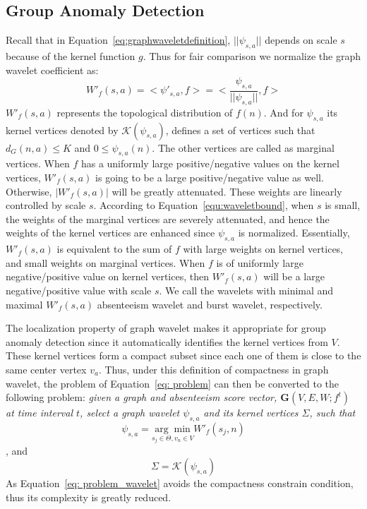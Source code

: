 \subsection{Group Anomaly Detection}
\label{sec:abnormalgroupdetection}
Recall that in Equation~\ref{eq:graphwaveletdefinition}, $||\psi_{s,a}||$ depends on scale $s$ because of the kernel function $g$. Thus for fair comparison we normalize the graph wavelet coefficient as:
\begin{equation}
\label{eq:graphwavelet}
W'_f(s,a)=<{\psi'_{s,a}}, f>=<\frac{\psi_{s,a}}{||\psi_{s,a}||}, f>
\end{equation}$W'_f(s,a)$ represents the topological distribution of $f(n)$. And for $\psi_{s,a}$ its kernel vertices denoted by $\mathcal{K}(\psi_{s,a})$, defines a set of vertices such that $d_G(n,a)\leq K$ and $0\leq\psi_{s,a}(n)$. The other vertices are called as marginal vertices. When $f$ has a uniformly large positive/negative values on the kernel vertices, $W'_f(s,a)$ is going to be a large positive/negative value as well.
Otherwise, $|W'_f(s,a)|$ will be greatly attenuated.
These weights are linearly controlled by scale $s$.
According to Equation~\ref{equ:waveletbound}, when $s$ is small, the weights of the marginal vertices are severely attenuated, and hence the weights of the kernel vertices are enhanced since $\psi_{s,a}$ is normalized.
Essentially, $W'_f(s,a)$ is equivalent to the sum of $f$ with large weights on kernel vertices, and small weights on marginal vertices.
When $f$ is of uniformly large negative/positive value on kernel vertices, then $W'_f(s,a)$ will be a large negative/positive value with scale $s$.
We call the wavelets with minimal and maximal $W'_f(s,a)$ absenteeism wavelet and burst wavelet, respectively.


The localization property of graph wavelet makes it appropriate for group anomaly detection since it automatically identifies the kernel vertices from $V$.  These kernel vertices form a compact subset since each one of them is close to the same center vertex $v_a$. Thus, under this definition of compactness in graph wavelet, the problem of Equation~\ref{eq: problem} can then be converted to the following problem:
\emph{given a graph and \textit{absenteeism score} vector, $\mathbf{G}(V,E,W;f^t)$ at time interval $t$, select a graph wavelet $\psi_{s,a}$ and its kernel vertices $\Sigma$, such that}
\begin{equation}
 \label{eq: problem_wavelet}
    \psi_{s,a}=\underset{s_j\in \Theta, v_n\in V}{\arg\min} {W'_f(s_j,n)}
\end{equation}, and
\begin{equation}
 \label{eq: problem_wavelet_3}
    \Sigma=\mathcal{K}(\psi_{s,a})
\end{equation}
As Equation~\ref{eq: problem_wavelet} avoids the compactness constrain condition, thus its complexity is greatly reduced.

